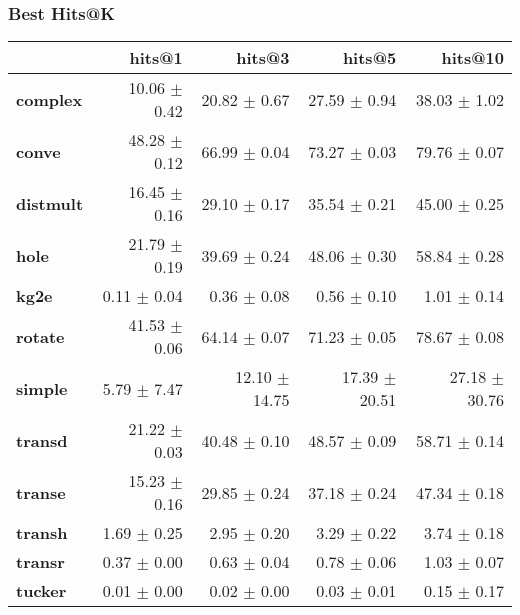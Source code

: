 \documentclass{article}
\begin{document}
    \subsubsection{Best Hits@K}
    \begin{center}
    \begin{tabular}{lrrrr}
\toprule
{} &        hits@1 &         hits@3 &         hits@5 &        hits@10 \\
\midrule
\textbf{complex } &  10.06 $\pm$ 0.42 &   20.82 $\pm$ 0.67 &   27.59 $\pm$ 0.94 &   38.03 $\pm$ 1.02 \\
\textbf{conve   } &  48.28 $\pm$ 0.12 &   66.99 $\pm$ 0.04 &   73.27 $\pm$ 0.03 &   79.76 $\pm$ 0.07 \\
\textbf{distmult} &  16.45 $\pm$ 0.16 &   29.10 $\pm$ 0.17 &   35.54 $\pm$ 0.21 &   45.00 $\pm$ 0.25 \\
\textbf{hole    } &  21.79 $\pm$ 0.19 &   39.69 $\pm$ 0.24 &   48.06 $\pm$ 0.30 &   58.84 $\pm$ 0.28 \\
\textbf{kg2e    } &   0.11 $\pm$ 0.04 &    0.36 $\pm$ 0.08 &    0.56 $\pm$ 0.10 &    1.01 $\pm$ 0.14 \\
\textbf{rotate  } &  41.53 $\pm$ 0.06 &   64.14 $\pm$ 0.07 &   71.23 $\pm$ 0.05 &   78.67 $\pm$ 0.08 \\
\textbf{simple  } &   5.79 $\pm$ 7.47 &  12.10 $\pm$ 14.75 &  17.39 $\pm$ 20.51 &  27.18 $\pm$ 30.76 \\
\textbf{transd  } &  21.22 $\pm$ 0.03 &   40.48 $\pm$ 0.10 &   48.57 $\pm$ 0.09 &   58.71 $\pm$ 0.14 \\
\textbf{transe  } &  15.23 $\pm$ 0.16 &   29.85 $\pm$ 0.24 &   37.18 $\pm$ 0.24 &   47.34 $\pm$ 0.18 \\
\textbf{transh  } &   1.69 $\pm$ 0.25 &    2.95 $\pm$ 0.20 &    3.29 $\pm$ 0.22 &    3.74 $\pm$ 0.18 \\
\textbf{transr  } &   0.37 $\pm$ 0.00 &    0.63 $\pm$ 0.04 &    0.78 $\pm$ 0.06 &    1.03 $\pm$ 0.07 \\
\textbf{tucker  } &   0.01 $\pm$ 0.00 &    0.02 $\pm$ 0.00 &    0.03 $\pm$ 0.01 &    0.15 $\pm$ 0.17 \\
\bottomrule
\end{tabular}

    \end{center}
\end{document}
